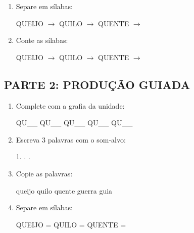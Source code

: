 \begin{exercicio}
\begin{enumerate}
  \item Separe em sílabas:
  \begin{center}
  QUEIJO $\rightarrow$ \underline{\hspace{1cm}} \quad QUILO $\rightarrow$ \underline{\hspace{1cm}} \quad QUENTE $\rightarrow$ \underline{\hspace{1cm}}
  \end{center}

  \item Conte as sílabas:
  \begin{center}
  QUEIJO $\rightarrow$ \underline{\hspace{0.9cm}} \quad QUILO $\rightarrow$ \underline{\hspace{0.9cm}} \quad QUENTE $\rightarrow$ \underline{\hspace{0.9cm}}
  \end{center}

\end{enumerate}

\subsection*{PARTE 2: PRODUÇÃO GUIADA}

\begin{enumerate}[resume]

  \item Complete com a grafia da unidade:
  \begin{center}
  QU\underline{~~~} \quad QU\underline{~~~} \quad QU\underline{~~~} \quad QU\underline{~~~} \quad QU\underline{~~~}
  \end{center}

  \item Escreva 3 palavras com o som-alvo:
  \begin{center}
  1. \underline{\hspace{3cm}} . \underline{\hspace{3cm}} . \underline{\hspace{3cm}}
  \end{center}

  \item Copie as palavras:
  \begin{center}
  queijo \quad quilo \quad quente \quad guerra \quad guia
  \end{center}

  \item Separe em sílabas:
  \begin{center}
  QUEIJO = \underline{\hspace{1cm}} \underline{\hspace{1cm}} \quad QUILO = \underline{\hspace{1cm}} \underline{\hspace{1cm}} \quad QUENTE = \underline{\hspace{1cm}} \underline{\hspace{1cm}}
  \end{center}


\end{enumerate}
\end{exercicio}
